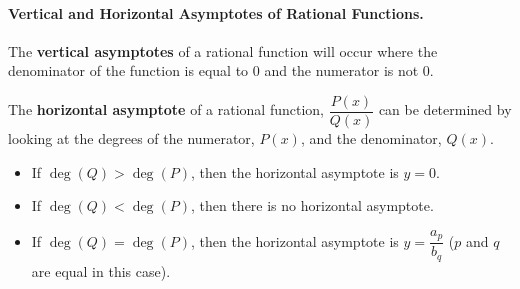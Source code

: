 \paragraph*{Vertical and Horizontal Asymptotes of Rational Functions.}
The {\bf vertical asymptotes} of a rational function will occur where the denominator of the function is equal to 0 and the numerator is not 0.

The {\bf horizontal asymptote} of a rational function, $\dfrac{P(x)}{Q(x)}$ can be determined by looking at the degrees of the numerator, $P(x)$, and the denominator, $Q(x)$.
\begin{itemize}
  \item If $\deg(Q) > \deg(P)$, then the horizontal asymptote is $y=0$.
  \item If $\deg(Q) < \deg(P)$, then there is no horizontal asymptote.
  \item If $\deg(Q) = \deg(P)$, then the horizontal asymptote is $y=\dfrac{a_p}{b_q}$ ($p$ and $q$ are equal in this case).
\end{itemize}


